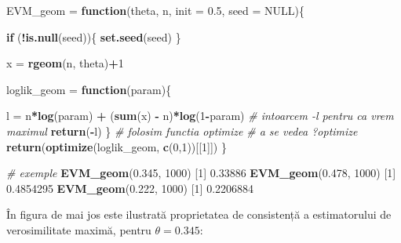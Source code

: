 \documentclass[]{article}
\newenvironment{Shaded}{\begin{snugshade}}{\end{snugshade}}
\newcommand{\KeywordTok}[1]{\textcolor[rgb]{0.13,0.29,0.53}{\textbf{#1}}}
\newcommand{\DataTypeTok}[1]{\textcolor[rgb]{0.13,0.29,0.53}{#1}}
\newcommand{\DecValTok}[1]{\textcolor[rgb]{0.00,0.00,0.81}{#1}}
\newcommand{\FloatTok}[1]{\textcolor[rgb]{0.00,0.00,0.81}{#1}}
\newcommand{\StringTok}[1]{\textcolor[rgb]{0.31,0.60,0.02}{#1}}
\newcommand{\CommentTok}[1]{\textcolor[rgb]{0.56,0.35,0.01}{\textit{#1}}}
\newcommand{\OtherTok}[1]{\textcolor[rgb]{0.56,0.35,0.01}{#1}}
\newcommand{\ControlFlowTok}[1]{\textcolor[rgb]{0.13,0.29,0.53}{\textbf{#1}}}
\newcommand{\OperatorTok}[1]{\textcolor[rgb]{0.81,0.36,0.00}{\textbf{#1}}}
\newcommand{\NormalTok}[1]{#1}
\begin{document}
\begin{Shaded}
\begin{Highlighting}[]
\NormalTok{EVM_geom =}\StringTok{ }\ControlFlowTok{function}\NormalTok{(theta, n, }\DataTypeTok{init =} \FloatTok{0.5}\NormalTok{, }\DataTypeTok{seed =} \OtherTok{NULL}\NormalTok{)\{}
  
  \ControlFlowTok{if}\NormalTok{ (}\OperatorTok{!}\KeywordTok{is.null}\NormalTok{(seed))\{}
    \KeywordTok{set.seed}\NormalTok{(seed)}
\NormalTok{  \}}
  
\NormalTok{  x =}\StringTok{ }\KeywordTok{rgeom}\NormalTok{(n, theta)}\OperatorTok{+}\DecValTok{1}
  
\NormalTok{  loglik_geom =}\StringTok{ }\ControlFlowTok{function}\NormalTok{(param)\{}
    
\NormalTok{    l =}\StringTok{ }\NormalTok{n}\OperatorTok{*}\KeywordTok{log}\NormalTok{(param) }\OperatorTok{+}\StringTok{ }\NormalTok{(}\KeywordTok{sum}\NormalTok{(x) }\OperatorTok{-}\StringTok{ }\NormalTok{n)}\OperatorTok{*}\KeywordTok{log}\NormalTok{(}\DecValTok{1}\OperatorTok{-}\NormalTok{param)}
    \CommentTok{# intoarcem -l pentru ca vrem maximul}
    \KeywordTok{return}\NormalTok{(}\OperatorTok{-}\NormalTok{l)}
\NormalTok{  \}}
  \CommentTok{# folosim functia optimize}
  \CommentTok{# a se vedea ?optimize}
  \KeywordTok{return}\NormalTok{(}\KeywordTok{optimize}\NormalTok{(loglik_geom, }\KeywordTok{c}\NormalTok{(}\DecValTok{0}\NormalTok{,}\DecValTok{1}\NormalTok{))[[}\DecValTok{1}\NormalTok{]])}
\NormalTok{\}}

\CommentTok{# exemple}
\KeywordTok{EVM_geom}\NormalTok{(}\FloatTok{0.345}\NormalTok{, }\DecValTok{1000}\NormalTok{)}
\NormalTok{[}\DecValTok{1}\NormalTok{] }\FloatTok{0.33886}
\KeywordTok{EVM_geom}\NormalTok{(}\FloatTok{0.478}\NormalTok{, }\DecValTok{1000}\NormalTok{)}
\NormalTok{[}\DecValTok{1}\NormalTok{] }\FloatTok{0.4854295}
\KeywordTok{EVM_geom}\NormalTok{(}\FloatTok{0.222}\NormalTok{, }\DecValTok{1000}\NormalTok{)}
\NormalTok{[}\DecValTok{1}\NormalTok{] }\FloatTok{0.2206884}
\end{Highlighting}
\end{Shaded}

În figura de mai jos este ilustrată proprietatea de consistență a
estimatorului de verosimilitate maximă, pentru \(\theta = 0.345\):
\end{document}
